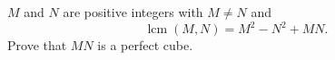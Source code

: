 $M$ and $N$ are positive integers with $M\ne N$ and
\[\operatorname{lcm}(M,N)=M^2-N^2+MN.\]
Prove that $MN$ is a perfect cube.
